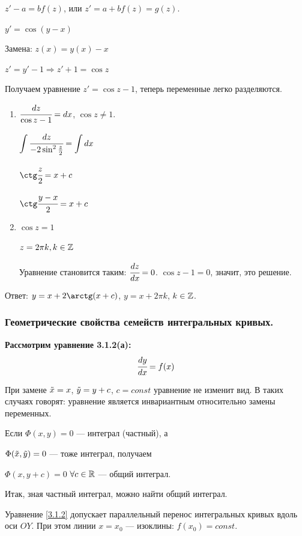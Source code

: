 $z' - a = bf(z)$, или $z' = a + bf(z) = g(z)$.
\vspace{3mm}
\begin{example}  $y' = \cos(y-x)$

    Замена: $z(x) = y (x) - x$
    
    $z' = y' - 1 \Rightarrow z'+1 = \cos z$
    
    Получаем уравнение $z' = \cos z - 1$, теперь переменные легко разделяются.
    \begin{enumerate}
        \item $\cfrac{dz}{\cos z - 1} = dx$, $\cos z\neq 1$.
        
        $\displaystyle \int \cfrac{dz}{-2\sin^2\frac{z}{2}} = \int dx$
        
        $\ctg \cfrac{z}{2} = x + c$
        
        $\ctg \cfrac{y-x}{2} = x+c$
        \item $\cos z = 1$
        
        $z = 2 \pi k, k \in \mathbb{Z}$
        
        Уравнение становится таким: $\cfrac{dz}{dx} = 0$. $\cos z - 1 = 0$, значит, это решение.
    \end{enumerate}
    Ответ: $y = x +2\arctg(x+c)$, $y = x + 2 \pi k$, $k \in \mathbb{Z}$.
\end{example}

\subsubsection{Геометрические свойства семейств интегральных кривых.}

\textbf{Рассмотрим уравнение 3.1.2(а):}
\begin{equation}\label{3.1.2(а)}
    \cfrac{dy}{dx} = f(x)
\end{equation}

При замене $\Tilde{x} = x$, $\Tilde{y} = y+c$, $c = const$  уравнение не изменит вид. В таких случаях говорят: уравнение является инвариантным относительно замены переменных.

Если $\Phi(x,y) = 0$ --- интеграл (частный), а

$\Phi(\Tilde{x}, \Tilde{y}) = 0$ --- тоже интеграл, получаем 

$\Phi(x, y+c) = 0$ $\forall c \in \mathbb{R}$ --- общий интеграл.

Итак, зная частный интеграл, можно найти общий интеграл.

Уравнение \ref{3.1.2} допускает параллельный перенос интегральных кривых вдоль оси $OY$. При этом линии $x = x_0$ --- изоклины: $f(x_0) = const$.

